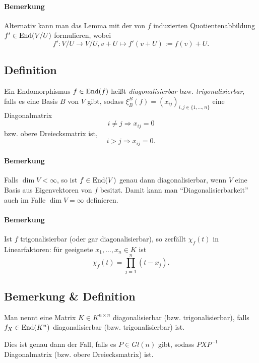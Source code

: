 \paragraph{Bemerkung}
	Alternativ kann man das Lemma mit der von $ f $ induzierten Quotientenabbildung $ f'\in \operatorname{End}(V/U) $ formulieren, wobei
		\[ f':V/U\to V/U, v+U\mapsto f'(v+U) := f(v)+U. \]
\subsection{Definition}
\begin{Definition}
	Ein Endomorphismus $ f\in\operatorname{End}(f) $ heißt \emph{diagonalisierbar} bzw. \emph{trigonalisierbar}, falls es eine Basis $ B $ von $ V $ gibt, sodass $ \xi_B^B(f)=(x_{ij})_{i,j\in\{1,\dots,n\}} $ eine Diagonalmatrix 
		\[ i\neq j\Rightarrow x_{ij} = 0 \]
	bzw. obere Dreiecksmatrix ist,
		\[ i>j \Rightarrow x_{ij} = 0. \]
\end{Definition}
\paragraph{Bemerkung}
	Falls $ \dim V<\infty $, so ist $ f\in\operatorname{End}(V) $ genau dann diagonalisierbar, wenn $ V $ eine Basis aus Eigenvektoren von $ f $ besitzt. Damit kann man "`Diagonalisierbarkeit"' auch im Falle $ \dim V=\infty $ definieren.
\paragraph{Bemerkung}
	Ist $ f $ trigonalisierbar (oder gar diagonalisierbar), so zerfällt $ \chi_f (t) $ in Linearfaktoren: für geeignete $ x_1,\dots,x_n\in K $ ist
		\[ \chi_f(t)=\prod_{j=1}^{n}(t-x_j). \]
\subsection{Bemerkung \& Definition}
\begin{Definition}
	Man nennt eine Matrix $ K\in K^{n\times n} $ diagonalisierbar (bzw. trigonalisierbar), falls $ f_X\in \operatorname{End}(K^n) $ diagonalisierbar (bzw. trigonalisierbar) ist.
\end{Definition}	

	Dies ist genau dann der Fall, falls es $ P\in Gl(n) $ gibt, sodass $ PXP^{-1} $ Diagonalmatrix (bzw. obere Dreiecksmatrix) ist.

